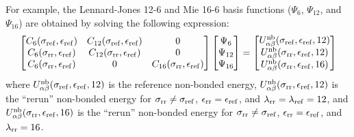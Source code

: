 \documentclass[journal=jced,manuscript=article]{achemso}
\begin{document}
For example, the Lennard-Jones 12-6 and Mie 16-6 basis functions ($\Psi_{6}$, $\Psi_{12}$, and $\Psi_{16}$) are obtained by solving the following expression:
\[
\begin{bmatrix}
C_{6}(\sigma_{\rm ref},\epsilon_{\rm ref}) & C_{12}(\sigma_{\rm ref},\epsilon_{\rm ref}) & 0 \\
C_{6}(\sigma_{\rm rr},\epsilon_{\rm ref}) & C_{12}(\sigma_{\rm rr},\epsilon_{\rm ref}) & 0 \\
C_{6}(\sigma_{\rm rr},\epsilon_{\rm ref}) & 0 & C_{16}(\sigma_{\rm rr},\epsilon_{\rm ref})
\end{bmatrix}
\begin{bmatrix}
\Psi_{6} \\
\Psi_{12} \\
\Psi_{16}
\end{bmatrix}
=
\begin{bmatrix}
U_{\alpha\beta}^{\rm nb}(\sigma_{\rm ref},\epsilon_{\rm ref},12) \\
U_{\alpha\beta}^{\rm nb}(\sigma_{\rm rr},\epsilon_{\rm ref},12) \\
U_{\alpha\beta}^{\rm nb}(\sigma_{\rm rr},\epsilon_{\rm ref},16)
\end{bmatrix}
\]
where $U_{\alpha\beta}^{\rm nb}(\sigma_{\rm ref},\epsilon_{\rm ref},12)$ is the reference non-bonded energy, $U_{\alpha\beta}^{\rm nb}(\sigma_{\rm rr},\epsilon_{\rm ref},12)$ is the ``rerun'' non-bonded energy for $\sigma_{\rm rr} \neq \sigma_{\rm ref}$, $\epsilon_{\rm rr} = \epsilon_{\rm ref}$, and $\lambda_{\rm rr} = \lambda_{\rm ref} = 12$, and $U_{\alpha\beta}^{\rm nb}(\sigma_{\rm rr},\epsilon_{\rm ref},16)$ is the ``rerun'' non-bonded energy for $\sigma_{\rm rr} \neq \sigma_{\rm ref}$, $\epsilon_{\rm rr} = \epsilon_{\rm ref}$, and $\lambda_{\rm rr} = 16$.

\end{document}
